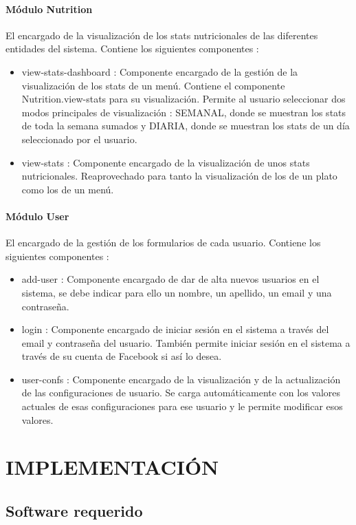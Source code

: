 \documentclass[12pt, a4paper, twoside]{book}
\begin{document}
	\subsubsection{Módulo Nutrition}
	El encargado de la visualización de los stats nutricionales de las diferentes entidades del sistema. Contiene los siguientes componentes : 
	\begin{itemize}
		\item view-stats-dashboard : Componente encargado de la gestión de la visualización de los stats de un menú. Contiene el componente Nutrition.view-stats para su visualización. Permite al usuario seleccionar dos modos principales de visualización : SEMANAL, donde se muestran los stats de toda la semana sumados y DIARIA, donde se muestran los stats de un día seleccionado por el usuario.
		\item view-stats : Componente encargado de la visualización de unos stats nutricionales. Reaprovechado para tanto la visualización de los de un plato como los de un menú.
	\end{itemize}
	\subsubsection{Módulo User}
	El encargado de la gestión de los formularios de cada usuario. Contiene los siguientes componentes : 
	\begin{itemize}
		\item add-user : Componente encargado de dar de alta nuevos usuarios en el sistema, se debe indicar para ello un nombre, un apellido, un email y una contraseña.
		\item login : Componente encargado de iniciar sesión en el sistema a través del email y contraseña del usuario. También permite iniciar sesión en el sistema a través de su cuenta de Facebook si así lo desea.
		\item user-confs : Componente encargado de la visualización y de la actualización de las configuraciones de usuario. Se carga automáticamente con los valores actuales de esas configuraciones para ese usuario y le permite modificar esos valores.
	\end{itemize}
	
	\chapter{IMPLEMENTACIÓN}
	\section{Software requerido}
\end{document}
